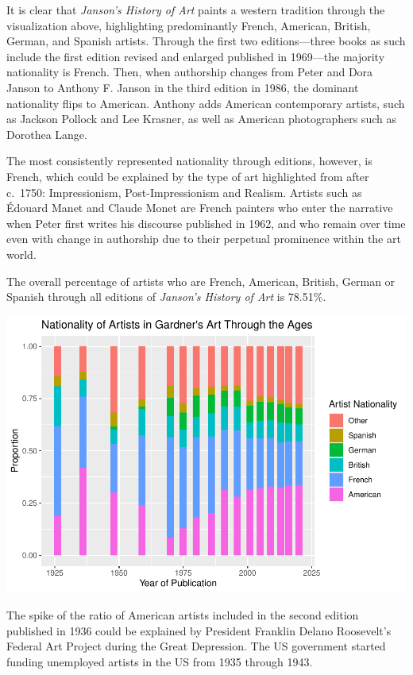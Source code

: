\documentclass[
  letterpaper,
  DIV=11,
  numbers=noendperiod]{scrreprt}
\begin{document}
It is clear that \emph{Janson's History of Art} paints a western
tradition through the visualization above, highlighting predominantly
French, American, British, German, and Spanish artists. Through the
first two editions---three books as such include the first edition
revised and enlarged published in 1969---the majority nationality is
French. Then, when authorship changes from Peter and Dora Janson to
Anthony F. Janson in the third edition in 1986, the dominant nationality
flips to American. Anthony adds American contemporary artists, such as
Jackson Pollock and Lee Krasner, as well as American photographers such
as Dorothea Lange.

The most consistently represented nationality through editions, however,
is French, which could be explained by the type of art highlighted from
after c.~1750: Impressionism, Post-Impressionism and Realism. Artists
such as Édouard Manet and Claude Monet are French painters who enter the
narrative when Peter first writes his discourse published in 1962, and
who remain over time even with change in authorship due to their
perpetual prominence within the art world.

The overall percentage of artists who are French, American, British,
German or Spanish through all editions of \emph{Janson's History of Art}
is 78.51\%.

\includegraphics{Chapter1/Chapter1_files/figure-pdf/gardnernationalitythroughtime-1.pdf}

The spike of the ratio of American artists included in the second
edition published in 1936 could be explained by President Franklin
Delano Roosevelt's Federal Art Project during the Great Depression. The
US government started funding unemployed artists in the US from 1935
through 1943.
\end{document}

